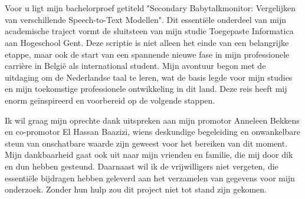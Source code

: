 
\chapter*{}%
\label{ch:voorwoord}







Voor u ligt mijn bachelorproef getiteld "Secondary Babytalkmonitor: Vergelijken van verschillende Speech-to-Text Modellen". Dit essentiële onderdeel van mijn academische traject vormt de sluitsteen van mijn studie Toegepaste Informatica aan Hogeschool Gent. Deze scriptie is niet alleen het einde van een belangrijke etappe, maar ook de start van een spannende nieuwe fase in mijn professionele carrière in België als international student. Mijn avontuur begon met de uitdaging om de Nederlandse taal te leren, wat de basis legde voor mijn studies en mijn toekomstige professionele ontwikkeling in dit land. Deze reis heeft mij enorm geïnspireerd en voorbereid op de volgende stappen.

Ik wil graag mijn oprechte dank uitspreken aan mijn promotor Anneleen Bekkens en co-promotor El Hassan Baazizi, wiens deskundige begeleiding en onwankelbare steun van onschatbare waarde zijn geweest voor het bereiken van dit moment. Mijn dankbaarheid gaat ook uit naar mijn vrienden en familie, die mij door dik en dun hebben gesteund. Daarnaast wil ik de vrijwilligers niet vergeten, die essentiële bijdragen hebben geleverd aan het verzamelen van gegevens voor mijn onderzoek. Zonder hun hulp zou dit project niet tot stand zijn gekomen.

